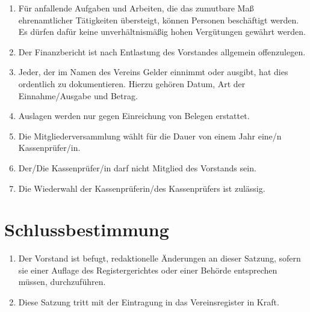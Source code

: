 \documentclass[12pt,a4paper,draft]{article}
\begin{document}
\begin{enumerate}
\item Für anfallende Aufgaben und Arbeiten, die das zumutbare Maß 
ehrenamtlicher Tätigkeiten übersteigt, können Personen beschäftigt werden. Es 
dürfen dafür keine unverhältnismäßig hohen Vergütungen gewährt werden.

\item Der Finanzbericht ist nach Entlastung des Vorstandes allgemein 
offenzulegen.

\item Jeder, der im Namen des Vereins Gelder einnimmt oder ausgibt, hat dies 
ordentlich zu dokumentieren. Hierzu gehören Datum, Art der Einnahme/Ausgabe und 
Betrag.

\item Auslagen werden nur gegen Einreichung von Belegen erstattet.

\item Die Mitgliederversammlung wählt für die Dauer von einem Jahr eine/n 
Kassenprüfer/in.

\item Der/Die Kassenprüfer/in darf nicht Mitglied des Vorstands sein.

\item Die Wiederwahl der Kassenprüferin/des Kassenprüfers ist zulässig.
\end{enumerate}

\section{Schlussbestimmung}
\begin{enumerate}
\item Der Vorstand ist befugt, redaktionelle Änderungen an dieser Satzung, 
sofern sie einer Auflage des Registergerichtes oder einer Behörde entsprechen 
müssen, durchzuführen.

\item Diese Satzung tritt mit der Eintragung in das Vereinsregister in Kraft.
\end{enumerate}

\end{document}
